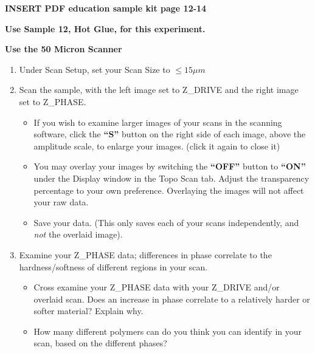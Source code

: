 \documentclass{../lab}
\begin{document}
\textbf{​INSERT PDF education sample kit page 12-14}

\textbf{Use Sample 12, Hot Glue, for this experiment.}

\textbf{Use the 50 Micron Scanner }

\begin{enumerate}
    \item Under Scan Setup, set your Scan Size to $\leq 15\mu m$

    \item Scan the sample, with the left image set to Z\_DRIVE and the right image set to Z\_PHASE.

    \begin{itemize}
        \item If you wish to examine larger images of your scans in the scanning software, click the \textbf{``S''} button on the right side of each image, above the amplitude scale, to enlarge your images.  (click it again to close it)

        \item You may overlay your images by switching the\textbf{ ``OFF''} button to \textbf{``ON''} under the Display window in the Topo Scan tab.  Adjust the transparency percentage to your own preference.  Overlaying the images will not affect your raw data.

        \item Save your data. (This only saves each of your scans independently, and \emph{not} the overlaid image).

    \end{itemize}

    \item Examine your Z\_PHASE data; differences in phase correlate to the hardness/softness of different regions in your scan.

    \begin{itemize}
        \item Cross examine your Z\_PHASE data with your Z\_DRIVE and/or overlaid scan.  Does an increase in phase correlate to a relatively harder or softer material? Explain why.

        \item How many different polymers can do you think you can identify in your scan, based on the different phases?

    \end{itemize}

\end{enumerate}
\end{document}
